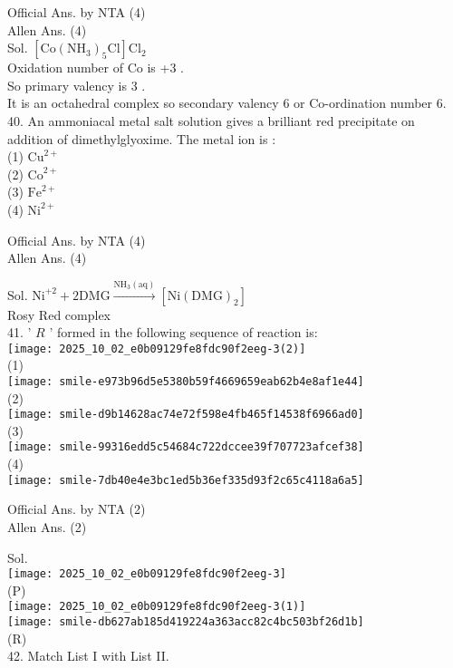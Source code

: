 \documentclass[10pt]{article}
\begin{document}
Official Ans. by NTA (4)\\
Allen Ans. (4)\\
Sol. \(\left[\mathrm{Co}\left(\mathrm{NH}_{3}\right)_{5} \mathrm{Cl}\right] \mathrm{Cl}_{2}\)\\
Oxidation number of Co is +3 .\\
So primary valency is 3 .\\
It is an octahedral complex so secondary valency 6 or Co-ordination number 6.\\
40. An ammoniacal metal salt solution gives a brilliant red precipitate on addition of dimethylglyoxime. The metal ion is :\\
(1) \(\mathrm{Cu}^{2+}\)\\
(2) \(\mathrm{Co}^{2+}\)\\
(3) \(\mathrm{Fe}^{2+}\)\\
(4) \(\mathrm{Ni}^{2+}\)

Official Ans. by NTA (4)\\
Allen Ans. (4)

Sol. \(\mathrm{Ni}^{+2}+2 \mathrm{DMG} \xrightarrow{\mathrm{NH}_{3}(\mathrm{aq})}\left[\mathrm{Ni}(\mathrm{DMG})_{2}\right]\)\\
Rosy Red complex\\
41. ' \(R\) ' formed in the following sequence of reaction is:\\
\texttt{[image: 2025\_10\_02\_e0b09129fe8fdc90f2eeg-3(2)]}\\
(1)\\
\texttt{[image: smile-e973b96d5e5380b59f4669659eab62b4e8af1e44]}\\
(2)\\
\texttt{[image: smile-d9b14628ac74e72f598e4fb465f14538f6966ad0]}\\
(3)\\
\texttt{[image: smile-99316edd5c54684c722dccee39f707723afcef38]}\\
(4)\\
\texttt{[image: smile-7db40e4e3bc1ed5b36ef335d93f2c65c4118a6a5]}

Official Ans. by NTA (2)\\
Allen Ans. (2)

Sol.\\
\texttt{[image: 2025\_10\_02\_e0b09129fe8fdc90f2eeg-3]}\\
(P)\\
\texttt{[image: 2025\_10\_02\_e0b09129fe8fdc90f2eeg-3(1)]}\\
\texttt{[image: smile-db627ab185d419224a363acc82c4bc503bf26d1b]}\\
(R)\\
42. Match List I with List II.
\end{document}
